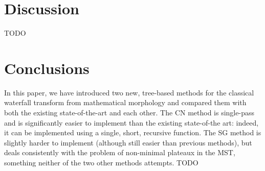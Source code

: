 \documentclass[a4paper]{article}
\begin{document}

\section{Discussion}
\label{sec:discussion}

TODO

\section{Conclusions}
\label{sec:conclusions}

In this paper, we have introduced two new, tree-based methods for the classical waterfall transform from mathematical morphology and compared them with both the existing state-of-the-art and each other. The CN method is single-pass and is significantly easier to implement than the existing state-of-the art: indeed, it can be implemented using a single, short, recursive function. The SG method is slightly harder to implement (although still easier than previous methods), but deals consistently with the problem of non-minimal plateaux in the MST, something neither of the two other methods attempts. TODO

\clearpage



\end{document}
